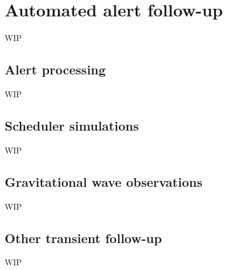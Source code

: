 \section{Automated alert follow-up}
\label{sec:followup}
\begin{colsection}


\begin{colsection}

WIP

\end{colsection}


\subsection{Alert processing}
\label{sec:alerts}
\begin{colsection}

WIP

\end{colsection}


\subsection{Scheduler simulations}
\label{sec:simulations}
\begin{colsection}

WIP

\end{colsection}


\subsection{Gravitational wave observations}
\label{sec:gw_followup}
\begin{colsection}

WIP

\end{colsection}


\subsection{Other transient follow-up}
\label{sec:other_followup}
\begin{colsection}

WIP

\end{colsection}


\end{colsection}


